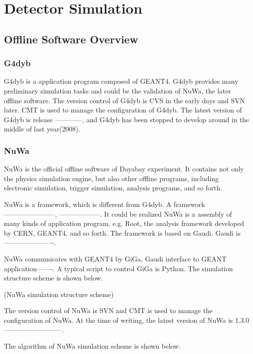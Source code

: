 \chapter {Detector Simulation}

\section {Offline Software Overview}

\subsection {G4dyb}

G4dyb is a application program composed of GEANT4.
G4dyb provides many preliminary simulation tasks and could be
the validation of NuWa, the later offline software.
The version control of G4dyb is CVS in the early days and
SVN later. CMT is used to manage the configuration of G4dyb.
The latest version of G4dyb is release ------------, and
G4dyb has been stopped to develop around in the middle of last year(2008).


\subsection {NuWa}

NuWa is the official offline software of Dayabay experiment.
It contains not only the physics simulation engine, but also
other offline programs, including electronic simulation,
trigger simulation, analysis programs, and so forth.

NuWa is a framework, which is different from G4dyb.
A framework-----------------------, ------------------.
It could be realized NuWa is a assembly of many kinds of application program,
e.g. Root, the analysis framework developed by CERN, GEANT4, and so forth.
The framework is based on Gaudi. Gaudi is ----------------------.

NuWa communicates with GEANT4 by GiGa, Gaudi interface to GEANT application-------.
A typical script to control GiGa is Python. The simulation structure scheme is shown below.


(NuWa simulation structure scheme)


The version control of NuWa is SVN and CMT is used to manage
the configuration of NuWa. At the time of writing, the latest
version of NuWa is 1.3.0--------------------------.

The algorithm of NuWa simulation scheme is shown below.



